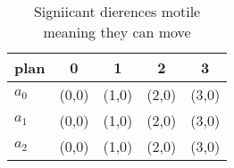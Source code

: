 \documentclass[a4paper]{article}
\begin{document}
\begin{table}
\begin{adjustbox}{width=0.5\columnwidth}
\begin{tabular}{|l|l|l|l|l|}
\hline
\textbf{plan} & \multicolumn{1}{c|}{\textbf{0}} & \multicolumn{1}{c|}{\textbf{1}} & \multicolumn{1}{c|}{\textbf{2}} & \multicolumn{1}{c|}{\textbf{3}} \\ \hline
\textbf{$a_0$}  & (0,0) & (1,0) & (2,0) & (3,0) \\ \hline
\textbf{$a_1$}  & (0,0) & (1,0) & (2,0) & (3,0) \\ \hline
\textbf{$a_2$}  & (0,0) & (1,0) & (2,0) & (3,0) \\ \hline
\end{tabular}
\end{adjustbox}
\caption{Signiicant dierences motile meaning they can move
}
\end{table}
\end{document}
